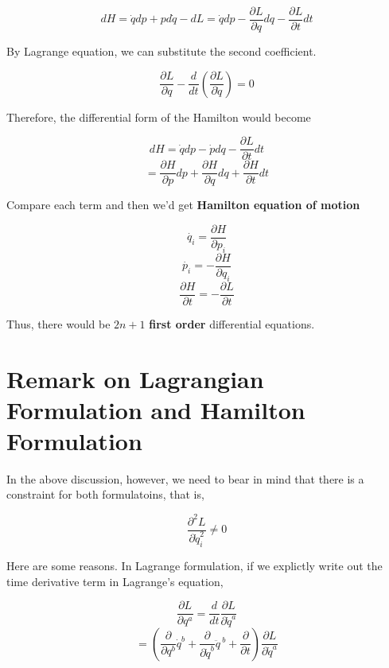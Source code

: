 \documentclass[12pt]{article}
\begin{document}
\begin{center}
    \[ dH = \dot{q}dp + pd\dot{q} - dL = \dot{q}dp - \frac{ \partial{L} }{ \partial{q} } dq - \frac{ \partial{L} }{ \partial{t} } dt \]
\end{center}

By Lagrange equation, we can substitute the second coefficient.

\begin{center}
    \[ \frac{\partial{L}}{\partial{q}} - \frac{d}{dt} \left( \frac{ \partial{L} }{ \partial{\dot{q}} }\right)= 0 \]
\end{center}

Therefore, the differential form of the Hamilton would become

\begin{center}
    \[ dH = \dot{q} dp - \dot{p} dq - \frac{\partial{L}}{\partial{t}} dt\]
    \[ = \frac{ \partial{H} }{ \partial{p} } dp + \frac{ \partial{H} }{ \partial{q} } dq + \frac{ \partial{H} }{ \partial{t} } dt\]
\end{center}

Compare each term and then we'd get \textbf{Hamilton equation of motion}

\begin{center}
    \[ \dot{q_i} = \frac{ \partial{H} }{ \partial{p_i} }\]
    \[ \dot{p_i} = -\frac{ \partial{H} }{ \partial{q_i} }\]
    \[ \frac{ \partial{H} }{ \partial{t} } = -\frac{ \partial{L} }{ \partial{t} }\]
\end{center}

Thus, there would be $2n+1$ \textbf{first order} differential equations.

\section{Remark on Lagrangian Formulation and Hamilton Formulation}

In the above discussion, however, we need to bear in mind that there is a constraint for both formulatoins, that is, 

\begin{center}
    \[ \frac{\partial^2 L}{\partial \dot{q}_i^2} \neq 0 \]
\end{center}

Here are some reasons. In Lagrange formulation, if we explictly write out the time derivative term in Lagrange's equation,

\begin{center}
    \[ \frac{\partial L}{\partial q^a} = \frac{d}{dt} \frac{\partial L}{\partial \dot{q}^a} \]
    \[ = \left(\frac{\partial}{\partial q^b}\dot{q}^b + \frac{\partial}{\partial \dot{q}^b}\ddot{q}^{\ b} + \frac{\partial }{\partial t} \right) \frac{\partial L}{\partial \dot{q}^a} \]
\end{center}
\end{document}
